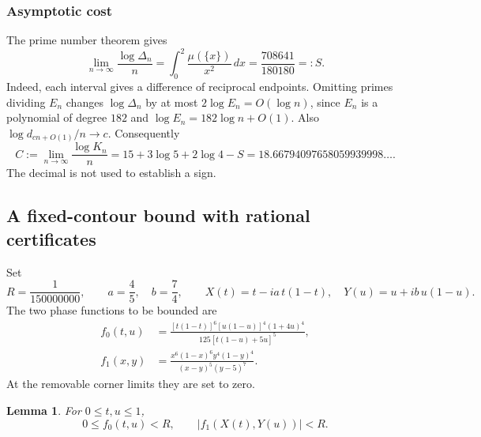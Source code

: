 \documentclass[11pt]{amsart}
\newcommand{\dd}{\,d}
\theoremstyle{plain}
\newtheorem{lemma}[theorem]{Lemma}
\theoremstyle{remark}\newtheorem{remark}[theorem]{Remark}
\numberwithin{equation}{section}
\begin{document}
\subsubsection{Asymptotic cost}
The prime number theorem gives
\begin{equation}\label{f:eq:saving}
 \lim_{n\to\infty}\frac{\log\Delta_n}{n}
 =\int_0^2\frac{\mu(\{x\})}{x^2}\dd x
 =\frac{708641}{180180}=:S.
\end{equation}
Indeed, each interval gives a difference of reciprocal endpoints. Omitting primes dividing $E_n$ changes $\log\Delta_n$ by at most $2\log E_n=O(\log n)$, since $E_n$ is a polynomial of degree $182$ and $\log E_n=182\log n+O(1)$.
Also $\log d_{cn+O(1)}/n\to c$. Consequently
\begin{equation}\label{f:eq:cost}
 C:=\lim_{n\to\infty}\frac{\log K_n}{n}
 =15+3\log5+2\log4-S
 =18.66794097658059939998\ldots.
\end{equation}
The decimal is not used to establish a sign.

\subsection{A fixed-contour bound with rational certificates}\label{f:sec:contours}
Set
\[
 R=\frac1{150000000},\qquad a=\frac45,\quad b=\frac74,
 \qquad X(t)=t-ia\,t(1-t),\quad Y(u)=u+ib\,u(1-u).
\]
The two phase functions to be bounded are
\begin{align}
 f_0(t,u)&=\frac{[t(1-t)]^6[u(1-u)]^4(1+4u)^4}
 {125[t(1-u)+5u]^5},\label{f:eq:f0}\\
 f_1(x,y)&=\frac{x^6(1-x)^6y^4(1-y)^4}{(x-y)^5(y-5)^7}.\label{f:eq:f1}
\end{align}
At the removable corner limits they are set to zero.

\begin{lemma}\label{f:lem:phase}
For $0\leq t,u\leq1$,
\[
 0\leq f_0(t,u)<R,\qquad |f_1(X(t),Y(u))|<R.
\]
\end{lemma}
\end{document}
